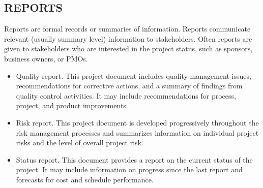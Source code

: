 \documentclass[11pt]{article}
\begin{document}
\subsection{REPORTS}
\label{sec:org0f985cf}
Reports are formal records or summaries of information. Reports communicate relevant (usually summary level) information to stakeholders. Often reports are given to stakeholders who are interested in the project status, such as sponsors, business owners, or PMOs.
\begin{itemize}
\item Quality report. This project document includes quality management issues, recommendations for corrective actions, and a summary of findings from quality control activities. It may include recommendations for process, project, and product improvements.
\item Risk report. This project document is developed progressively throughout the risk management processes and summarizes information on individual project risks and the level of overall project risk.
\item Status report. This document provides a report on the current status of the project. It may include information on progress since the last report and forecasts for cost and schedule performance.
\end{itemize}
\end{document}
